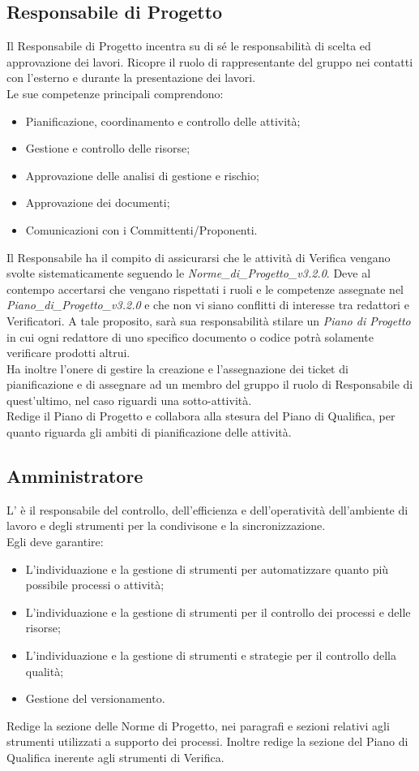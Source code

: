 \subsection{Responsabile di Progetto} %
\label{2.1}
Il Responsabile di Progetto incentra su di sé le responsabilità di scelta ed approvazione dei lavori. Ricopre il ruolo di rappresentante del gruppo nei contatti con l'esterno e durante la presentazione dei lavori.\\
Le sue competenze principali comprendono:
\begin{itemize}
\item Pianificazione, coordinamento e controllo delle attività;
\item Gestione e controllo delle risorse;
\item Approvazione delle analisi di gestione e rischio;
\item Approvazione dei documenti;
\item Comunicazioni con i Committenti/Proponenti.
\end{itemize}
Il Responsabile ha il compito di assicurarsi che le attività di Verifica vengano svolte sistematicamente seguendo le \emph{Norme\_di\_Progetto\_v3.2.0}. Deve al contempo accertarsi che vengano rispettati i ruoli e le competenze assegnate nel \emph{Piano\_di\_Progetto\_v3.2.0} e che non vi siano conflitti di interesse tra redattori e Verificatori. A tale proposito, sarà sua responsabilità stilare un \emph{Piano di Progetto} in cui ogni redattore di uno specifico documento o codice potrà solamente verificare prodotti altrui.\\
Ha inoltre l'onere di gestire la creazione e l'assegnazione dei ticket di pianificazione e di assegnare ad un membro del gruppo il ruolo di Responsabile di quest'ultimo, nel caso riguardi una sotto-attività.\\
Redige il Piano di Progetto e collabora alla stesura del Piano di Qualifica, per quanto riguarda gli ambiti di pianificazione delle attività.

\subsection{Amministratore}
\label{2.2}
L' è il responsabile del controllo, dell'efficienza e dell'operatività dell'ambiente di lavoro e degli strumenti per la condivisone e la sincronizzazione.\\
Egli deve garantire:
\begin{itemize}
\item L'individuazione e la gestione di strumenti per automatizzare quanto più possibile processi o attività;
\item L'individuazione e la gestione di strumenti per il controllo dei processi e delle risorse;
\item L'individuazione e la gestione di strumenti e strategie per il controllo della qualità;
\item Gestione del versionamento.
\end{itemize}
Redige la sezione delle Norme di Progetto, nei paragrafi e sezioni relativi agli strumenti utilizzati a supporto dei processi. Inoltre redige la sezione del Piano di Qualifica inerente agli strumenti di Verifica.

